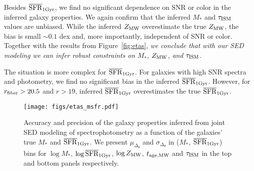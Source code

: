 Besides $\overline{\rm SFR}_{\rm 1Gyr}$, we find no significant dependence on SNR or color in the
inferred galaxy properties. 
We again confirm that the inferred $M_*$ and $\tau_{\rm ISM}$ values are
unbiased.
While the inferred $Z_{\rm MW}$ overestimate the true $Z_{\rm MW}$, the bias is
small $\sim 0.1$ dex and, more importantly, independent of SNR or color. 
Together with the results from Figure~\ref{fig:etas}, \emph{we conclude that with our
SED modeling we can infer robust constraints on $M_*$, $Z_{\rm MW}$, and
$\tau_{\rm ISM}$}.

The situation is more complex for $\overline{\rm SFR}_{\rm 1Gyr}$. 
For galaxies with high SNR spectra and photometry, we find no significant bias
in the inferred $\overline{\rm SFR}_{\rm 1Gyr}$. 
However, for $r_{\rm fiber} > 20.5$ and $r > 19$, inferred $\overline{\rm SFR}_{\rm 1Gyr}$
overestimates the true $\overline{\rm SFR}_{\rm 1Gyr}$. 


\begin{figure}
\begin{center}
    \texttt{[image: figs/etas\_msfr.pdf]} \label{fig:etas_msfr}
    \caption{
        Accuracy and precision of the galaxy properties inferred from joint SED
        modeling of spectrophotometry as a function of the galaxies' true $M_*$
        and $\overline{\rm SFR}_{\rm 1Gyr}$. 
        We present $\mu_{\Delta_{\theta}}$ and $\sigma_{\Delta_{\theta}}$ in
        ($M_*$, $\overline{\rm SFR}_{\rm 1Gyr}$) bins for $\log M_*$, $\log\overline{\rm SFR}_{\rm 1Gyr}$, $\log Z_{\rm
        MW}$, $t_{\rm age, MW}$ and $\tau_{\rm ISM}$ in the top and bottom
        panels respectively. 
    }
\end{center}
\end{figure}

